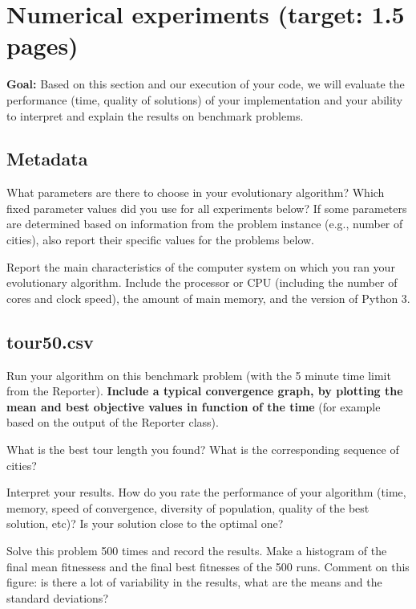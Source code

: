 \documentclass[a4paper,10pt]{article}
\newcommand{\ReplaceMe}[1]{{\color{blue}#1}}
\newcommand{\RemoveMe}[1]{{\color{purple}#1}}
\begin{document}
\section{Numerical experiments (target: 1.5 pages)}

\RemoveMe{\textbf{Goal:} Based on this section and our execution of your code, we will evaluate the performance (time, quality of solutions) of your implementation and your ability to interpret and explain the results on benchmark problems.}

\subsection{Metadata}

\ReplaceMe{What parameters are there to choose in your evolutionary algorithm? Which fixed parameter values did you use for all experiments below? If some parameters are determined based on information from the problem instance (e.g., number of cities), also report their specific values for the problems below.

Report the main characteristics of the computer system on which you ran your evolutionary algorithm. Include the processor or CPU (including the number of cores and clock speed), the amount of main memory, and the version of Python 3.}


\subsection{tour50.csv}

\ReplaceMe{Run your algorithm on this benchmark problem (with the 5 minute time limit from the Reporter). \textbf{Include a typical convergence graph, by plotting the mean and best objective values in function of the time} (for example based on the output of the Reporter class).

What is the best tour length you found? What is the corresponding sequence of cities? 

Interpret your results. How do you rate the performance of your algorithm (time, memory, speed of convergence, diversity of population, quality of the best solution, etc)? Is your solution close to the optimal one?

Solve this problem 500 times and record the results. Make a histogram of the final mean fitnessess and the final best fitnesses of the 500 runs. Comment on this figure: is there a lot of variability in the results, what are the means and the standard deviations?}
\end{document}
